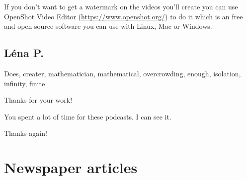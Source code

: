 \documentclass[12pt,oneside]{report}
\begin{document}
\begin{spacing}{1.2}
If you don't want to get a watermark on the videos you'll create you can use OpenShot Video Editor (\url{https://www.openshot.org/}) to do it which is an free and open-source software you can use with Linux, Mac or Windows.
\color{black}

\subsection*{Léna P.}

Does, creater, mathematician, mathematical, overcrowding, enough, isolation, infinity, finite

\color{blue}
Thanks for your work!

You spent a lot of time for these podcasts. I can see it.

Thanks again!
\color{black}



\section{Newspaper articles}





\end{spacing}
\end{document}
